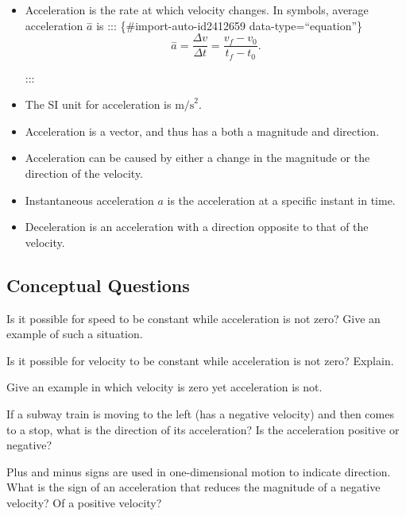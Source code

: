 \documentclass[
]{book}
\newenvironment{conceptual-questions}{}{}
\begin{document}
\begin{itemize}
\item
  \protect\hypertarget{import-auto-id2412645}{}{Acceleration is the rate at which velocity changes. In symbols,
  {average acceleration} \(\overset{-}{a}{}\)
  is}
  ::: \{\#import-auto-id2412659 data-type=``equation''\}
  \[{{{\overset{-}{a} = \frac{\Delta v}{\Delta t}} = \frac{v_{f} - v_{0}}{t_{f} - t_{0}}}\text{.}}{}\]

  :::
\item
  \protect\hypertarget{import-auto-id2412738}{}{The SI unit for acceleration is
  \(\text{m/s}^{2}{}\).}
\item
  \protect\hypertarget{import-auto-id2412758}{}{Acceleration is a vector, and thus has a both a magnitude and
  direction.}
\item
  \protect\hypertarget{import-auto-id2412770}{}{Acceleration can be caused by either a change in the magnitude or
  the direction of the velocity.}
\item
  \protect\hypertarget{import-auto-id2412772}{}{Instantaneous acceleration \(a{}\) is the acceleration at a specific
  instant in time.}
\item
  \protect\hypertarget{import-auto-id2412729}{}{Deceleration is an acceleration with a direction opposite to that
  of the velocity.}
\end{itemize}

\hypertarget{fs-id3526388}{}
\begin{conceptual-questions}

\hypertarget{conceptual-questions-3}{%
\subsection{Conceptual Questions}\label{conceptual-questions-3}}

\hypertarget{fs-id3526394}{}
\leavevmode\hypertarget{fs-id3526396}{}%
Is it possible for speed to be constant while acceleration is not zero?
Give an example of such a situation.

\hypertarget{fs-id4016173}{}
\leavevmode\hypertarget{fs-id4016175}{}%
Is it possible for velocity to be constant while acceleration is not
zero? Explain.

\hypertarget{fs-id3514238}{}
\leavevmode\hypertarget{fs-id3514240}{}%
Give an example in which velocity is zero yet acceleration is not.

\hypertarget{fs-id1765962}{}
\leavevmode\hypertarget{fs-id1765964}{}%
If a subway train is moving to the left (has a negative velocity) and
then comes to a stop, what is the direction of its acceleration? Is the
acceleration positive or negative?

\hypertarget{fs-id1780345}{}
\leavevmode\hypertarget{fs-id1780347}{}%
Plus and minus signs are used in one-dimensional motion to indicate
direction. What is the sign of an acceleration that reduces the
magnitude of a negative velocity? Of a positive velocity?

\end{conceptual-questions}
\end{document}
